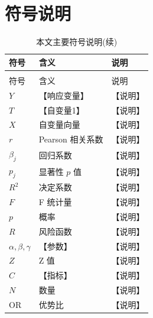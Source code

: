 
\section{符号说明}

\begin{longtable}{>{\centering\arraybackslash}p{}>{\centering\arraybackslash}p{}>{\centering\arraybackslash}p{}}
  \caption{本文主要符号说明}\\
  \toprule
  符号 & 含义 & 说明 \\
  \midrule
  \endfirsthead
  \caption{本文主要符号说明(续)}\\
  \toprule
  符号 & 含义 & 说明 \\
  \midrule
  \endhead
  \bottomrule
  \endfoot
  $Y$ & 【响应变量】 & 【说明】\\
  $T$ & 【自变量1】 & 【说明】\\
  $X$ & 自变量向量 & 【说明】\\
  $r$ & Pearson 相关系数 & 【说明】\\
  $\beta_j$ & 回归系数 & 【说明】\\
  $p_j$ & 显著性 $p$ 值 & 【说明】\\
  $R^2$ & 决定系数 & 【说明】\\
  $F$ & F 统计量 & 【说明】\\
  $p$ & 概率 & 【说明】\\
  $R$ & 风险函数 & 【说明】\\
  $\alpha, \beta, \gamma$ & 【参数】 & 【说明】\\
  $Z$ & Z 值 & 【说明】\\
  $C$ & 【指标】 & 【说明】\\
  $N$ & 数量 & 【说明】\\
  $\mathrm{OR}$ & 优势比 & 【说明】\\
\end{longtable}
